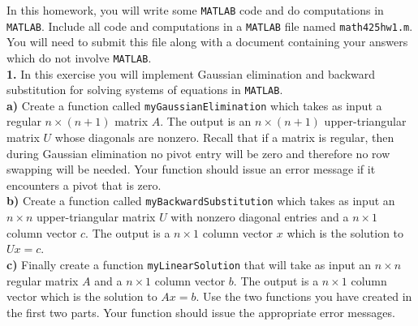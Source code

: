 \documentclass[11pt]{amsart}
\theoremstyle{definition}  %
\begin{document}


\noindent In this homework, you will write some {\tt MATLAB} code and do computations in {\tt MATLAB}. Include all code and computations
in a {\tt MATLAB} file named {\tt math425hw1.m}. You will need to submit this file along with a document containing your answers which do not
involve {\tt MATLAB}.\\


\noindent
{\bf 1.} In this exercise you will implement Gaussian elimination and backward substitution for solving systems of equations in {\tt MATLAB}. \\
{\bf a)} Create a function called {\tt myGaussianElimination} which takes as input a regular $n \times (n+1)$ matrix $A$. The output is an $n \times (n+1)$
upper-triangular matrix $U$ whose diagonals are nonzero. Recall that if a matrix is regular, then during Gaussian elimination no pivot entry will be zero and
therefore no row swapping will be needed. Your function should issue an error message if it encounters a pivot that is zero. \\
{\bf b)} Create a function called {\tt myBackwardSubstitution} which takes as input an $n \times n$ upper-triangular matrix $U$ with nonzero
diagonal entries and a $n \times 1$ column vector $c$. The output is a $n \times 1$ column vector $x$ which is the solution to $Ux = c$. \\
{\bf c)} Finally create a function {\tt myLinearSolution} that will take as input an $n \times n$ regular matrix $A$ and a $n \times 1$ column vector $b$.
The output is a $n \times 1$ column vector which is the solution to $Ax = b$. Use the two functions you have created in the first two parts. Your function
should issue the appropriate error messages.  \\
\end{document}
